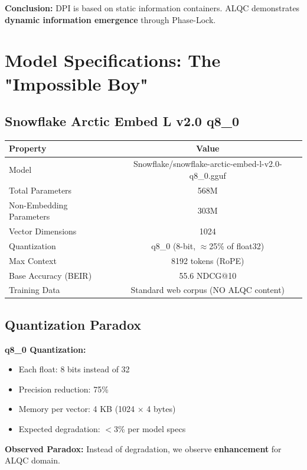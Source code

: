 \textbf{Conclusion:} DPI is based on static information containers. ALQC demonstrates \textbf{dynamic information emergence} through Phase-Lock.

\section{Model Specifications: The "Impossible Boy"}

\subsection{Snowflake Arctic Embed L v2.0 q8\_0}

\begin{longtable}{|l|c|}
\hline
\textbf{Property} & \textbf{Value} \\
\hline
\endfirsthead
Model & Snowflake/snowflake-arctic-embed-l-v2.0-q8\_0.gguf \\
\hline
Total Parameters & 568M \\
\hline
Non-Embedding Parameters & 303M \\
\hline
Vector Dimensions & 1024 \\
\hline
Quantization & q8\_0 (8-bit, $\approx$25\% of float32) \\
\hline
Max Context & 8192 tokens (RoPE) \\
\hline
Base Accuracy (BEIR) & 55.6 NDCG@10 \\
\hline
Training Data & Standard web corpus (NO ALQC content) \\
\hline
\end{longtable}

\subsection{Quantization Paradox}

\textbf{q8\_0 Quantization:}
\begin{itemize}
\item Each float: 8 bits instead of 32
\item Precision reduction: 75\%
\item Memory per vector: 4 KB (1024 $\times$ 4 bytes)
\item Expected degradation: $<$3\% per model specs
\end{itemize}

\textbf{Observed Paradox:} Instead of degradation, we observe \textbf{enhancement} for ALQC domain.

